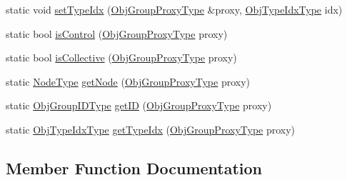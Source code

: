 \begin{DoxyCompactItemize}
\item 
static void \hyperlink{structvt_1_1objgroup_1_1proxy_1_1_obj_group_proxy_abc524b044b063a643ede1ea3be501892}{set\+Type\+Idx} (\hyperlink{namespacevt_ad7cae989df485fccca57f0792a880a8e}{Obj\+Group\+Proxy\+Type} \&proxy, \hyperlink{namespacevt_1_1objgroup_a378e4b966221779c74f3a2f921eb2421}{Obj\+Type\+Idx\+Type} idx)
\item 
static bool \hyperlink{structvt_1_1objgroup_1_1proxy_1_1_obj_group_proxy_a165dce2ea9c2f711132ed70e38c7835d}{is\+Control} (\hyperlink{namespacevt_ad7cae989df485fccca57f0792a880a8e}{Obj\+Group\+Proxy\+Type} proxy)
\item 
static bool \hyperlink{structvt_1_1objgroup_1_1proxy_1_1_obj_group_proxy_a457aec12597def45b485d3dc12023a32}{is\+Collective} (\hyperlink{namespacevt_ad7cae989df485fccca57f0792a880a8e}{Obj\+Group\+Proxy\+Type} proxy)
\item 
static \hyperlink{namespacevt_a866da9d0efc19c0a1ce79e9e492f47e2}{Node\+Type} \hyperlink{structvt_1_1objgroup_1_1proxy_1_1_obj_group_proxy_ac35fcfc81aac560d6cd16bc980c7d3b5}{get\+Node} (\hyperlink{namespacevt_ad7cae989df485fccca57f0792a880a8e}{Obj\+Group\+Proxy\+Type} proxy)
\item 
static \hyperlink{namespacevt_1_1objgroup_a54a50ff6833bf618e5bedb9a3b6d0e07}{Obj\+Group\+I\+D\+Type} \hyperlink{structvt_1_1objgroup_1_1proxy_1_1_obj_group_proxy_ad2d36832aa9ed3ee219a248d04d53dce}{get\+ID} (\hyperlink{namespacevt_ad7cae989df485fccca57f0792a880a8e}{Obj\+Group\+Proxy\+Type} proxy)
\item 
static \hyperlink{namespacevt_1_1objgroup_a378e4b966221779c74f3a2f921eb2421}{Obj\+Type\+Idx\+Type} \hyperlink{structvt_1_1objgroup_1_1proxy_1_1_obj_group_proxy_ad7cb9ad1cade184ec9a4320e04547dc1}{get\+Type\+Idx} (\hyperlink{namespacevt_ad7cae989df485fccca57f0792a880a8e}{Obj\+Group\+Proxy\+Type} proxy)
\end{DoxyCompactItemize}


\subsection{Member Function Documentation}
\mbox{\label{structvt_1_1objgroup_1_1proxy_1_1_obj_group_proxy_a0f29068c61712b0c2f9a78000f63cff9}} 

